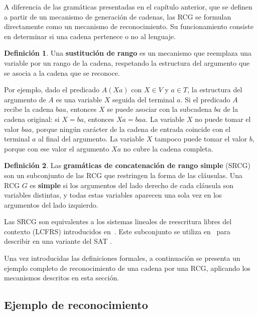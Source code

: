 \documentclass{report}
\theoremstyle{definition}
\newtheorem{definicion}{Definición}[chapter]
\theoremstyle{plain}
\theoremstyle{remark}
\begin{document}
A diferencia de las gramáticas presentadas en el capítulo anterior, que
se definen a partir de un mecanismo de generación de cadenas, las RCG
se formulan directamente como un mecanismo de reconocimiento. Su
funcionamiento consiste en determinar si una cadena pertenece o no al
lenguaje.

\begin{definicion}
Una \textbf{sustitución de rango} es un mecanismo que reemplaza una
variable por un rango de la cadena, respetando la estructura del
argumento que se asocia a la cadena que se reconoce.
\end{definicion}

Por ejemplo, dado el predicado $A(Xa)$ con $X \in V$ y $a \in T$, la
estructura del argumento de $A$ es una variable $X$ seguida del
terminal $a$. Si el predicado $A$ recibe la cadena $baa$, entonces $X$
se puede asociar con la subcadena $ba$ de la cadena original: si
$X = ba$, entonces $Xa = baa$. La variable $X$ no puede tomar el valor
$baa$, porque ningún carácter de la cadena de entrada coincide con el
terminal $a$ al final del argumento. La variable $X$ tampoco puede
tomar el valor $b$, porque con ese valor el argumento $Xa$ no cubre la
cadena completa.

\begin{definicion}
Las \textbf{gramáticas de concatenación de rango simple} (SRCG) son un
subconjunto de las RCG que restringen la forma de las cláusulas. Una
RCG $G$ es \textbf{simple} si los argumentos del lado derecho de cada
cláusula son variables distintas, y todas estas variables aparecen una
sola vez en los argumentos del lado izquierdo.
\end{definicion}

Las SRCG son equivalentes a los sistemas lineales de reescritura libres
del contexto (LCFRS) introducidos en~\cite{vijayshanker1987lcfrs}. Este
subconjunto se utiliza en~\cite{aguilera2016srcg} para describir  en una variante del SAT .

Una vez introducidas las definiciones formales, a continuación se
presenta un ejemplo completo de reconocimiento de una cadena por una
RCG, aplicando los mecanismos descritos en esta sección.

\subsection{Ejemplo de reconocimiento}
\end{document}
